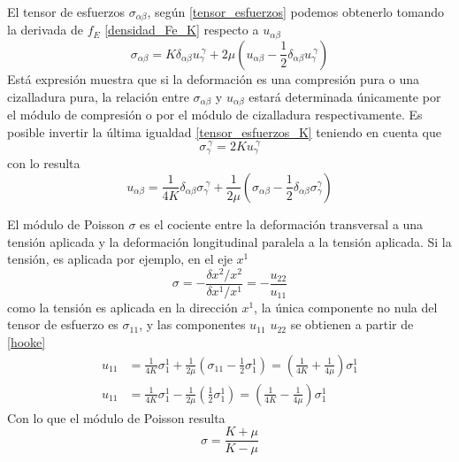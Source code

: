 El tensor de esfuerzos $\sigma_{\alpha\beta}$, según \eqref{tensor_esfuerzos}
podemos obtenerlo tomando la derivada de $f_E$ \eqref{densidad_Fe_K} respecto
a $u_{\alpha\beta}$
\begin{equation}\label{tensor_esfuerzos_K}
\sigma_{\alpha\beta}=K\delta_{\alpha\beta}u_{\gamma}^{\ \gamma}+2\mu\left(u_{\alpha\beta}-\frac{1}{2}\delta_{\alpha\beta}u_{\gamma}^{\ \gamma}\right)
\end{equation}
Está expresión muestra que si la deformación es una compresión pura o una
cizalladura pura, la relación entre $\sigma_{\alpha\beta}$ y $u_{\alpha\beta}$
estará determinada únicamente por el módulo de compresión o por el módulo de
cizalladura respectivamente. Es posible invertir la última igualdad
\eqref{tensor_esfuerzos_K} teniendo en cuenta que
\begin{equation}
\sigma_{\gamma}^{\ \gamma}=2 K u_{\gamma}^{\ \gamma}
\end{equation}
con lo resulta
\begin{equation}\label{hooke}
u_{\alpha\beta}=\frac{1}{4K}\delta_{\alpha\beta}\sigma_{\gamma}^{\ \gamma}+\frac{1}{2\mu}\left(\sigma_{\alpha\beta}-\frac{1}{2}\delta_{\alpha\beta}\sigma_{\gamma}^{\gamma}\right)
\end{equation}


El módulo de Poisson $\sigma$ es el cociente entre la deformación transversal
a una tensión aplicada y la deformación longitudinal paralela a la tensión
aplicada. Si la tensión, es aplicada por ejemplo, en el eje $x^1$
\begin{equation}
\sigma=-\frac{\delta x^2 / x^2}{\delta x^1 / x^1}=-\frac{u_{22}}{u_{11}}
\end{equation}
como la tensión es aplicada en la dirección $x^1$, la única componente no nula
del tensor de esfuerzo es $\sigma_{11}$, y las componentes $u_{11}$ $u_{22}$
se obtienen a partir de \eqref{hooke}
\begin{align}
u_{11}&=\frac{1}{4K}\sigma_1^1+\frac{1}{2\mu}\left(\sigma_{11}-\frac{1}{2}\sigma_1^1\right)=\left(\frac{1}{4K}+\frac{1}{4\mu}\right)\sigma_1^1\\
u_{11}&=\frac{1}{4K}\sigma_1^1-\frac{1}{2\mu}\left(\frac{1}{2}\sigma_1^1\right)=\left(\frac{1}{4K}-\frac{1}{4\mu}\right)\sigma_1^1
\end{align}
Con lo que el módulo de Poisson resulta
\begin{equation}
\sigma=\frac{K+\mu}{K-\mu}
\end{equation}

